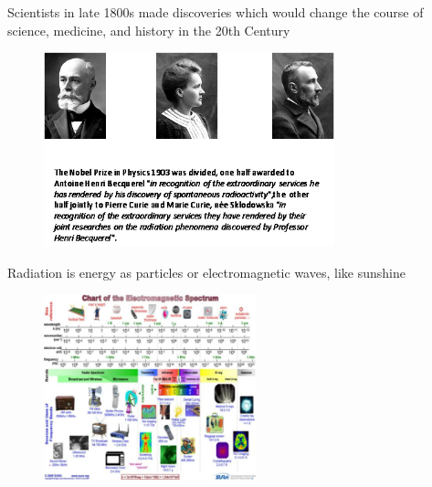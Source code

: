 \documentclass[aspectratio=1610,pdftex,dvipsnames,compress,xcolor={dvipsnames}]{beamer}
\begin{document}
\addtocounter{framenumber}{-1}
\begin{frame}{Scientists in late 1800s made discoveries which would change the course of science, medicine, and history in the 20th Century}
    \begin{figure}
        \centering
        \includegraphics[width=0.75\textwidth]{nobel.jpg}
    \end{figure}
\end{frame}


\begin{frame}{Radiation is energy as particles or electromagnetic waves, like sunshine}
    \begin{figure}
        \centering
        \href{https://www.researchgate.net/profile/Ngai_Chan/publication/277996216/figure/fig5/AS:336497640263680@1457238697222/The-electromagnetic-spectrum-for-different-frequency-bands-and-the-corresponding.jpg}{\includegraphics[width=0.55\textwidth]{waves.jpg}}
    \end{figure}
\end{frame}
\end{document}

